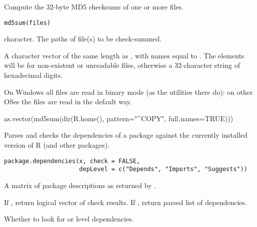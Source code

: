 %
\begin{Description}\relax
Compute the 32-byte MD5 checksums of one or more files.
\end{Description}
%
\begin{Usage}
\begin{verbatim}
md5sum(files)
\end{verbatim}
\end{Usage}
%
\begin{Arguments}
\begin{ldescription}
\item[\code{files}] character. The paths of file(s) to be check-summed.
\end{ldescription}
\end{Arguments}
%
\begin{Value}
A character vector of the same length as , with names
equal to . The elements
will be  for non-existent or unreadable files, otherwise
a 32-character string of hexadecimal digits.

On Windows all files are read in binary mode (as the 
utilities there do): on other OSes the files are read in the default way.
\end{Value}
%
\begin{SeeAlso}\relax
{}
\end{SeeAlso}
%
\begin{Examples}
\begin{ExampleCode}
as.vector(md5sum(dir(R.home(), pattern="^COPY", full.names=TRUE)))
\end{ExampleCode}
\end{Examples}
%
\begin{Description}\relax
Parses and checks the dependencies of a package against the currently
installed version of R (and other packages). 
\end{Description}
%
\begin{Usage}
\begin{verbatim}
package.dependencies(x, check = FALSE,
                     depLevel = c("Depends", "Imports", "Suggests"))
\end{verbatim}
\end{Usage}
%
\begin{Arguments}
\begin{ldescription}
\item[\code{x}] A matrix of package descriptions as returned by
.
\item[\code{check}] If , return logical vector of check results.
If , return parsed list of dependencies.
\item[\code{depLevel}] Whether to look for  or 
level dependencies.
\end{ldescription}
\end{Arguments}
